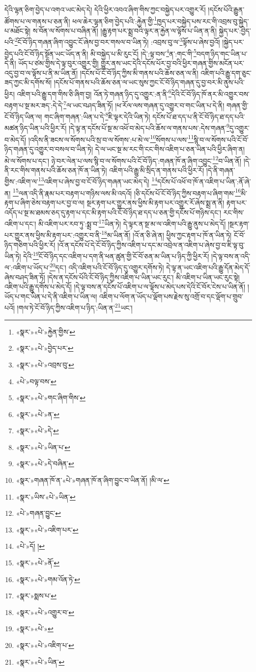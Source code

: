 དེའི་ལྷན་ཅིག་བྱེད་པ་འགའ་ཡང་མེད་དེ། དེའི་ཕྱིར་འབའ་ཞིག་གིས་ཀྱང་བསྐྱེད་པར་འགྱུར་རོ། །དངོས་པོའི་རྒྱུན་ཚོགས་པ་ལ་གནས་པ་ཅན་ནི། ཕལ་ཆེར་ལྷན་ཅིག་བྱེད་པའི་:རྐྱེན་གྱི་\footnote{«སྣར་»«པེ་»རྐྱེན་གྱིས་}ཁྱད་པར་བསྐྱེད་པས་རང་གི་འབྲས་བུ་སྐྱེད་པ་མཐོང་སྟེ། ས་བོན་ལ་སོགས་པ་བཞིན་ནོ། །རྒྱུ་རྟག་པར་སྨྲ་བའི་ལྟར་ན་རྐྱེན་ལ་ལྟོས་པ་ཡིན་ན་ནི། སྐྱེད་པར་:བྱེད་པའི་\footnote{«སྣར་»«པེ་»བྱེད་པར་}ངོ་བོ་ཉིད་གཞན་ཞིག་འབྱུང་ངོ་ཞེས་བྱ་བར་གསལ་བ་ཡིན་ཏེ། :འབྲས་བུ་ལ་\footnote{«སྣར་»«པེ་»འབྲས་བུ་}ལྟོས་པ་ཞེས་བྱའོ། །སྐྱེད་པར་བྱེད་པའི་ངོ་བོ་ཉིད་སྔོན་ཡང་ཡོད་ན་ནི། མི་བསྐྱེད་པ་མི་རུང་ངོ། །དེ་:ལྟ་བས་\footnote{«པེ་»བལྟ་བས་}ན་:གང་གི་\footnote{«སྣར་»«པེ་»གང་ཞིག་གིས་}བདག་ཉིད་གང་ཡིན་པ་དེ་ནི། ཡོད་པ་ཙམ་གྱིས་དེ་ལྟ་བུར་འགྱུར་གྱི། གྱུར་ནས་ཡང་དེའི་དངོས་པོར་བྱ་བའི་ཕྱིར་གཞན་གྱིས་མངོན་པར་འདུ་བྱ་བ་ལ་ལྟོས་པ་ནི་མ་ཡིན་ནོ། །དངོས་པོ་ངོ་བོ་ཉིད་ཀྱིས་མི་གནས་པའི་ཆོས་ཅན་ལ་ནི། འཇིག་པའི་རྒྱུ་དག་ཅུང་ཟད་ཀྱང་མི་དགོས་སོ། །དངོས་པོ་གནས་པའི་ཆོས་ཅན་ལ་ཡང་སུས་ཀྱང་ངོ་བོ་ཉིད་གཞན་དུ་བྱ་བར་མི་ནུས་པའི་ཕྱིར། འཇིག་པའི་རྒྱུ་དག་གིས་ཅི་ཞིག་བྱ། འོན་ཏེ་གཞན་ཉིད་དུ་འགྱུར་:ན་ནི་\footnote{«སྣར་»«པེ་»ན་}དེའི་ངོ་བོ་ཉིད་ཁོ་ནར་མི་འགྱུར་བས་བརྟག་པ་སྔ་མར་ཟད་:དེ་དེ་\footnote{«སྣར་»«པེ་»དེ་}ལ་ཡང་བཤད་ཟིན་ཏོ། །ཕ་རོལ་ལས་གཞན་དུ་འགྱུར་བ་གང་ཡིན་པ་དེ་ནི། གཞན་གྱི་ངོ་བོ་ཉིད་ཡིན་ལ། གང་ཞིག་གཞན་:ཡིན་པ་དེ་\footnote{«སྣར་»«པེ་»ཡིན་པ་}ཇི་ལྟར་དེའི་ཡིན་ཏེ། དངོས་པོ་ཐ་དད་པ་ནི་ངོ་བོ་ཉིད་ཐ་དད་པའི་མཚན་ཉིད་ཡིན་པའི་ཕྱིར་རོ། །དེ་ལྟ་ན་དངོས་པོ་སྔ་མ་འཕོ་བ་མེད་པའི་ཆོས་ལ་གནས་པས་:དེས་གཞན་\footnote{«སྣར་»«པེ་»དེ་བཞིན་}དུ་འགྱུར་བ་མེད་དོ། །འདིས་ནི་ཟངས་ལ་སོགས་པའི་སྲ་བ་ལ་སོགས་:པ་མེ་ལ་\footnote{«སྣར་»གཞན་ཁོ་ན་«པེ་»གཞན་ཁོ་ན་ཞིག་བྱུང་བ་ཡིན་ནོ། །མི་ལ་}སོགས་པ་ལས་\footnote{«སྣར་»ཡིས་«པེ་»ཡིན་}སྙི་བ་ལ་སོགས་པའི་ངོ་བོ་ཉིད་གཞན་དུ་འགྱུར་བ་བསལ་བ་ཡིན་ཏེ། དེ་ལ་ཡང་སྔ་མ་རང་གི་ངང་གིས་འཇིག་པ་ཅན་ཡིན་པའི་ཕྱིར་ཞིག་ན། མེ་ལ་སོགས་པ་དང་། ཉེ་བར་ལེན་པ་ལས་སྙི་བ་ལ་སོགས་པའི་ངོ་བོ་ཉིད་:གཞན་ཁོ་ན་ཞིག་འབྱུང་\footnote{«པེ་»གཞན་བྱུང་}བ་ཡིན་ནོ། །དེ་ནི་རང་གིས་གནས་པའི་ཆོས་ཅན་ཁོ་ན་ཡིན་ཏེ། འཇིག་པའི་རྒྱུ་མི་སྲིད་ན་གནས་པའི་ཕྱིར་རོ། །དེ་ནི་གཞན་གྱིས་:འཇིག་ལ་\footnote{«སྣར་»«པེ་»འཇིག་པར་}འཇིག་པ་ཞེས་བྱ་བ་ངོ་བོ་ཉིད་གཞན་ཡང་མེད་དེ། \footnote{«པེ་»དོ། ། }དངོས་པོ་འཕོ་བ་ཁོ་ན་འཇིག་པ་ཡིན་:ནོ་ཞེ་ན། \footnote{«སྣར་»«པེ་»ནོ་}ལན་འདི་ནི་རྣམ་པར་བརྟག་པ་གཉིས་ལས་མི་འདའོ། །ཅི་དངོས་པོ་ངོ་བོ་ཉིད་ཀྱིས་བརྟག་པ་ཞིག་གམ་\footnote{«སྣར་»«པེ་»གམ་འོན་ཏེ་}མི་རྟག་པ་ཞིག་ཅེས་བརྟག་པར་བྱ་བ་ལ། སྔར་རྟག་པར་གྱུར་ནས་ཕྱིས་མི་རྟག་པར་འགྱུར་རོ་ཞེས་སྨྲ་ན་ནི། རྟག་པར་འདོད་པ་སྔ་མ་ཐམས་ཅད་དུ་རྟག་པ་དང་མི་རྟག་པའི་ངོ་བོ་ཉིད་ཐ་དད་པ་ཅན་གྱི་དངོས་པོ་གཉིས་དང་། རང་གིས་འཇིག་པ་དང་། མི་འཇིག་པར་རབ་ཏུ་:སྨྲ་བ་\footnote{«སྣར་»སྨས་པ་}ཡིན་ཏེ། དེ་ལྟར་ན་སྔ་མ་ལ་འཇིག་པའི་རྒྱུ་ནུས་པ་མེད་དོ། །སྔར་རྟག་པར་གྱུར་ནས་ཕྱིས་མི་རྟག་པར་:འགྱུར་བ་ནི་\footnote{«སྣར་»«པེ་»འགྱུར་བ་}མ་ཡིན་ནོ། །འོ་ན་ཅི་ཞེ་ན། ཕྱིས་ཀྱང་རྟག་པ་ཁོ་ན་ཡིན་ཏེ། ངོ་བོ་ཉིད་གཅིག་པའི་ཕྱིར་རོ། །འོ་ན་དངོས་པོ་དེ་ངོ་བོ་ཉིད་ཀྱིས་འཇིག་པ་དང་མ་འབྲེལ་ན་འཇིག་པ་ཞེས་བྱ་བ་ཇི་ལྟ་བུ་ཡིན་ཏེ། དེའི་\footnote{«སྣར་»«པེ་»}ངོ་བོ་ཉིད་དང་འཇིག་པ་དག་ནི་ཕན་ཚུན་གྱི་ངོ་བོ་ཅན་མ་ཡིན་པ་ཉིད་ཀྱི་ཕྱིར་རོ། །དེ་ལྟ་བས་ན་འདི་ལ་:འཇིག་པ་ཡོད་པ་\footnote{«སྣར་»«པེ་»འཇིག་པ་}དང་། འདི་འཇིག་པའི་ངོ་བོ་ཉིད་དུ་འགྱུར་དགོས་ཏེ། དེ་ལྟ་ན་ཡང་འཇིག་པའི་རྒྱུ་དོན་མེད་དོ་ཞེས་བཤད་ཟིན་ཏོ། །དེས་ན་དངོས་པོའི་ངོ་བོ་ཉིད་ཀྱིས་འཇིག་པ་ཡིན་ཡང་རུང་། མི་འཇིག་པ་ཡིན་ཡང་རུང་སྟེ། འཇིག་པའི་རྒྱུ་དགོས་པ་མེད་དོ། །དེ་ལྟ་བས་ན་དངོས་པོ་འཇིག་པ་ལ་ལྟོས་པ་མེད་པས་དེའི་ངོ་བོར་ངེས་པ་ཡིན་ནོ། །ཡོད་པ་གང་ཡིན་པ་དེ་ནི་འཇིག་པ་ཡིན་ལ། འཇིག་པ་ལོག་ན་ཡོད་པ་ལྡོག་པས་རྗེས་སུ་འགྲོ་བ་དང་ལྡོག་པ་གྲུབ་པའོ། །གལ་ཏེ་ངོ་བོ་ཉིད་ཀྱིས་འཇིག་པ་ཉིད་:ཡིན་ན་\footnote{«སྣར་»«པེ་»ཡིན་}ཡང་། 